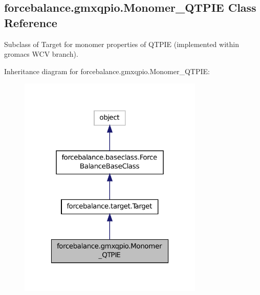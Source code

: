 \hypertarget{classforcebalance_1_1gmxqpio_1_1Monomer__QTPIE}{\subsection{forcebalance.\-gmxqpio.\-Monomer\-\_\-\-Q\-T\-P\-I\-E Class Reference}
\label{classforcebalance_1_1gmxqpio_1_1Monomer__QTPIE}
}


Subclass of Target for monomer properties of Q\-T\-P\-I\-E (implemented within gromacs W\-C\-V branch).  




Inheritance diagram for forcebalance.\-gmxqpio.\-Monomer\-\_\-\-Q\-T\-P\-I\-E\-:\nopagebreak
\begin{figure}[H]
\begin{center}
\leavevmode
\includegraphics[width=250pt]{classforcebalance_1_1gmxqpio_1_1Monomer__QTPIE__inherit__graph}
\end{center}
\end{figure}


